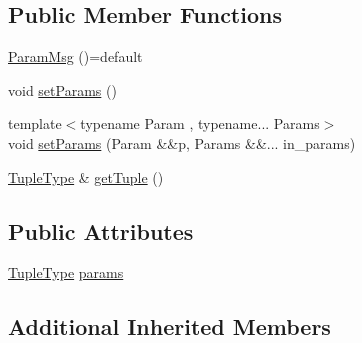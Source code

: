 \subsection*{Public Member Functions}
\begin{DoxyCompactItemize}
\item 
\hyperlink{structvt_1_1messaging_1_1_param_msg_3_01_tuple_00_01std_1_1enable__if__t_3_01is__byte__copyable_50e4a53750896883a846627550850f59_ab09a04140f07bf5b72c6f82cbcae8f9b}{Param\+Msg} ()=default
\item 
void \hyperlink{structvt_1_1messaging_1_1_param_msg_3_01_tuple_00_01std_1_1enable__if__t_3_01is__byte__copyable_50e4a53750896883a846627550850f59_ac94c24c043d69101319252235d7eafb9}{set\+Params} ()
\item 
{\footnotesize template$<$typename Param , typename... Params$>$ }\\void \hyperlink{structvt_1_1messaging_1_1_param_msg_3_01_tuple_00_01std_1_1enable__if__t_3_01is__byte__copyable_50e4a53750896883a846627550850f59_ac874cc2847c71bffec650269e248b45b}{set\+Params} (Param \&\&p, Params \&\&... in\+\_\+params)
\item 
\hyperlink{structvt_1_1messaging_1_1_param_msg_3_01_tuple_00_01std_1_1enable__if__t_3_01is__byte__copyable_50e4a53750896883a846627550850f59_a63c0c672da0bf7b284da9647aad497f8}{Tuple\+Type} \& \hyperlink{structvt_1_1messaging_1_1_param_msg_3_01_tuple_00_01std_1_1enable__if__t_3_01is__byte__copyable_50e4a53750896883a846627550850f59_acc98e81baad8e288db26a6bdb944a4e7}{get\+Tuple} ()
\end{DoxyCompactItemize}
\subsection*{Public Attributes}
\begin{DoxyCompactItemize}
\item 
\hyperlink{structvt_1_1messaging_1_1_param_msg_3_01_tuple_00_01std_1_1enable__if__t_3_01is__byte__copyable_50e4a53750896883a846627550850f59_a63c0c672da0bf7b284da9647aad497f8}{Tuple\+Type} \hyperlink{structvt_1_1messaging_1_1_param_msg_3_01_tuple_00_01std_1_1enable__if__t_3_01is__byte__copyable_50e4a53750896883a846627550850f59_a69170a79900e7a5b7d4a02e05aff9b2d}{params}
\end{DoxyCompactItemize}
\subsection*{Additional Inherited Members}


